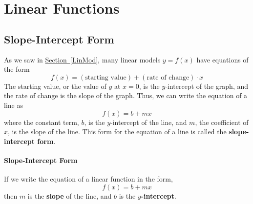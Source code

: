 \documentclass[10pt,]{book}
\newcommand{\terminology}[1]{\textbf{#1}}
\theoremstyle{plain}
\theoremstyle{definition}
\theoremstyle{definition}
\theoremstyle{definition}
\theoremstyle{definition}
\theoremstyle{definition}
\numberwithin{equation}{section}
\begin{document}
\section[Linear Functions]{Linear Functions}\label{linear-functions}
\typeout{************************************************}
\typeout{************************************************}
\subsection[Slope-Intercept Form]{Slope-Intercept Form}\label{subsection-24}

    As we saw in \hyperref[LinMod]{Section~\ref{LinMod}}, many linear models \(y = f (x)\) have equations of the form
    \begin{equation*}f (x) = (\text{starting value}) + (\text{rate of change}) \cdot x\end{equation*}
    The starting value, or the value of \(y\) at \(x = 0\), is the \(y\)-intercept of the graph, and the rate of change is the slope of the graph. Thus, we can write the equation of a line as
    \begin{equation*}f (x) = b + mx\end{equation*}
    where the constant term, \(b\), is the \(y\)-intercept of the line, and \(m\), the coefficient of \(x\), is the slope of the line. This form for the equation of a line is called the \terminology{slope-intercept form}.
%
\typeout{************************************************}
\typeout{************************************************}
\paragraph[Slope-Intercept Form]{Slope-Intercept Form}\label{paragraphs-15}

        If we write the equation of a linear function in the form,
        \begin{equation*}f (x) = b + mx\end{equation*}
        then \(m\) is the \terminology{slope} of the line, and \(b\) is the \terminology{\(y\)-intercept}.
\par
\end{document}
